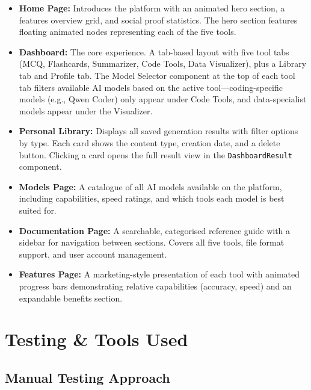 \documentclass[12pt,a4paper]{article}
\begin{document}
\begin{itemize}
    \item \textbf{Home Page:} Introduces the platform with an animated hero section, a features overview grid, and social proof statistics. The hero section features floating animated nodes representing each of the five tools.

    \item \textbf{Dashboard:} The core experience. A tab-based layout with five tool tabs (MCQ, Flashcards, Summarizer, Code Tools, Data Visualizer), plus a Library tab and Profile tab. The Model Selector component at the top of each tool tab filters available AI models based on the active tool—coding-specific models (e.g., Qwen Coder) only appear under Code Tools, and data-specialist models appear under the Visualizer.

    \item \textbf{Personal Library:} Displays all saved generation results with filter options by type. Each card shows the content type, creation date, and a delete button. Clicking a card opens the full result view in the \texttt{DashboardResult} component.

    \item \textbf{Models Page:} A catalogue of all AI models available on the platform, including capabilities, speed ratings, and which tools each model is best suited for.

    \item \textbf{Documentation Page:} A searchable, categorised reference guide with a sidebar for navigation between sections. Covers all five tools, file format support, and user account management.

    \item \textbf{Features Page:} A marketing-style presentation of each tool with animated progress bars demonstrating relative capabilities (accuracy, speed) and an expandable benefits section.
\end{itemize}



\clearpage

\section{Testing \& Tools Used}

\subsection{Manual Testing Approach}
\end{document}
